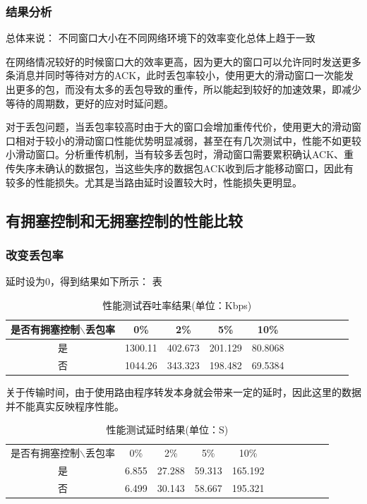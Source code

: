 \documentclass[UTF8,a4paper,10pt]{ctexart}
\begin{document}
\subsubsection{结果分析}
总体来说：
不同窗口大小在不同网络环境下的效率变化总体上趋于一致\par
在网络情况较好的时候窗口大的效率更高，因为更大的窗口可以允许同时发送更多条消息并同时等待对方的ACK，此时丢包率较小，使用更大的滑动窗口一次能发出更多的包，而没有太多的丢包导致的重传，所以能起到较好的加速效果，即减少等待的周期数，更好的应对时延问题。\par
对于丢包问题，当丢包率较高时由于大的窗口会增加重传代价，使用更大的滑动窗口相对于较小的滑动窗口性能优势明显减弱，甚至在有几次测试中，性能不如更较小滑动窗口。分析重传机制，当有较多丢包时，滑动窗口需要累积确认ACK、重传失序未确认的数据包，当这些失序的数据包ACK收到后才能移动窗口，因此有较多的性能损失。尤其是当路由延时设置较大时，性能损失更明显。
\subsection{有拥塞控制和无拥塞控制的性能比较}
\subsubsection{改变丢包率}
延时设为0，得到结果如下所示：
表
\begin{table}[!htbp]
  \centering
  \begin{tabular}{ccccccccccc}
  \toprule  
  是否有拥塞控制$\backslash$丢包率& 0\%& 2\%& 5\%& 10\%\\
  \midrule
  是& 1300.11& 402.673& 201.129& 80.8068\\
  否& 1044.26& 343.323& 198.482& 69.5384\\
  \bottomrule
  \end{tabular}
  \caption{性能测试吞吐率结果(单位：Kbps)}
\end{table}

关于传输时间，由于使用路由程序转发本身就会带来一定的延时，因此这里的数据并不能真实反映程序性能。
\begin{table}[!htbp]
  \centering
  \begin{tabular}{ccccccccccc}
  \toprule  
  是否有拥塞控制$\backslash$丢包率& 0\%& 2\%& 5\%& 10\%\\
  是& 6.855& 27.288& 59.313& 165.192\\
  否& 6.499& 30.143& 58.667& 195.321\\
  \bottomrule
  \end{tabular}
  \caption{性能测试延时结果(单位：S)}
\end{table}
\end{document}
